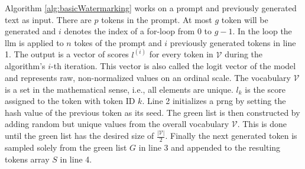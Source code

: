 	Algorithm \ref{alg:basicWatermarking} works on a prompt and previously generated text as input.
	There are $p$ tokens in the prompt.
	At most $g$ token will be generated and $i$ denotes the index of a for-loop from $0$ to $g-1$.
	In the loop the \ac{llm} is applied to $n$ tokes of the prompt and $i$ previously generated tokens in line 1.
	The output is a vector of scores $l^{(i)}$ for every token in $\mathcal{V}$ during the algorithm's $i$-th iteration.
    This vector is also called the logit vector of the model and represents raw, non-normalized values on an ordinal scale.
    The vocabulary $\mathcal{V}$ is a set in the mathematical sense, i.e., all elements are unique.
    $l_k$ is the score assigned to the token with token ID $k$.
	Line 2 initializes a \ac{prng} by setting the hash value of the previous token as its seed.
    The green list is then constructed by adding random but unique values from the overall vocabulary $\mathcal{V}$.
    This is done until the green list has the desired size of $\frac{|\mathcal{V}|}{2}$.
    Finally the next generated token is sampled solely from the green list $G$ in line 3 and appended to the resulting tokens array $S$ in line 4.

